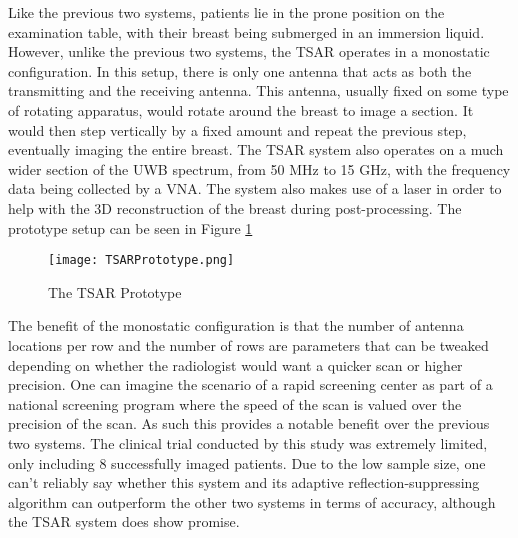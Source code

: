 Like the previous two systems, patients lie in the prone position on the examination table, with their breast being
submerged in an immersion liquid. However, unlike the previous two systems, the TSAR operates in a monostatic
configuration. In this setup, there is only one antenna that acts as both the transmitting and the receiving antenna.
This antenna, usually fixed on some type of rotating apparatus, would rotate around the breast to image a section. It
would then step vertically by a fixed amount and repeat the previous step, eventually imaging the entire breast. The
TSAR system also operates on a much wider section of the UWB spectrum, from 50 MHz to 15 GHz, with the frequency data
being collected by a VNA. The system also makes use of a laser in order to help with the 3D reconstruction of the breast
during post-processing. The prototype setup can be seen in Figure \ref{fig:TSARPrototype} \hfill \break

\begin{figure}
    \texttt{[image: TSARPrototype.png]}
    \centering
    \caption{The TSAR Prototype \cite{bourquiPrototypeSystemMeasuring2012}}
    \label{fig:TSARPrototype}
\end{figure}

The benefit of the monostatic configuration is that the number of antenna locations per row and the number of rows are
parameters that can be tweaked depending on whether the radiologist would want a quicker scan or higher precision. One
can imagine the scenario of a rapid screening center as part of a national screening program where the speed of the scan
is valued over the precision of the scan. As such this provides a notable benefit over the previous two systems. The
clinical trial conducted by this study was extremely limited, only including 8 successfully imaged patients. Due to the
low sample size, one can't reliably say whether this system and its adaptive reflection-suppressing algorithm can
outperform the other two systems in terms of accuracy, although the TSAR system does show promise. \hfill 
